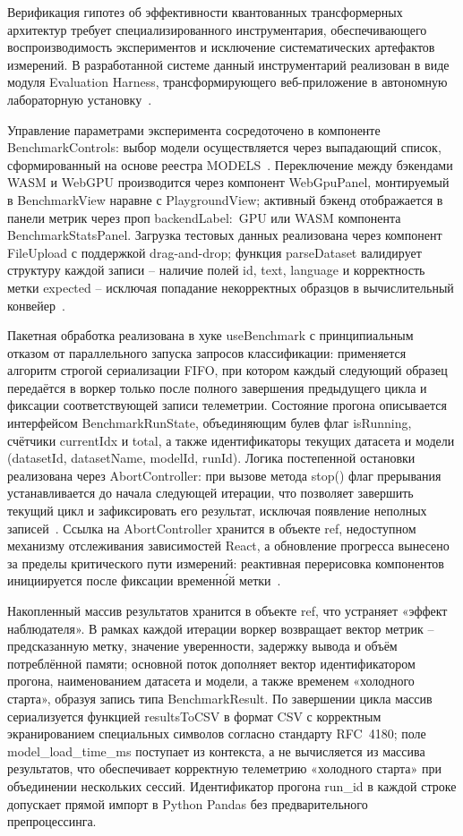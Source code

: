 Верификация гипотез об эффективности квантованных трансформерных архитектур требует специализированного инструментария, обеспечивающего воспроизводимость экспериментов и исключение систематических артефактов измерений. В разработанной системе данный инструментарий реализован в виде модуля Evaluation Harness, трансформирующего веб-приложение в автономную лабораторную установку~\cite{wang2024anatomizing, husom2025sustainable}.

Управление параметрами эксперимента сосредоточено в компоненте BenchmarkControls: выбор модели осуществляется через выпадающий список, сформированный на основе реестра MODELS~\cite{xu2024ondevice}. Переключение между бэкендами WASM и WebGPU производится через компонент WebGpuPanel, монтируемый в BenchmarkView наравне с PlaygroundView; активный бэкенд отображается в панели метрик через проп backendLabel:~GPU или WASM компонента BenchmarkStatsPanel. Загрузка тестовых данных реализована через компонент FileUpload с поддержкой drag-and-drop; функция parseDataset валидирует структуру каждой записи – наличие полей id, text, language и корректность метки expected – исключая попадание некорректных образцов в вычислительный конвейер~\cite{wang2024anatomizing}.

Пакетная обработка реализована в хуке useBenchmark с принципиальным отказом от параллельного запуска запросов классификации: применяется алгоритм строгой сериализации FIFO, при котором каждый следующий образец передаётся в воркер только после полного завершения предыдущего цикла и фиксации соответствующей записи телеметрии. Состояние прогона описывается интерфейсом BenchmarkRunState, объединяющим булев флаг isRunning, счётчики currentIdx и total, а также идентификаторы текущих датасета и модели (datasetId, datasetName, modelId, runId). Логика постепенной остановки реализована через AbortController: при вызове метода stop() флаг прерывания устанавливается до начала следующей итерации, что позволяет завершить текущий цикл и зафиксировать его результат, исключая появление неполных записей~\cite{jia2024empowering}. Ссылка на AbortController хранится в объекте ref, недоступном механизму отслеживания зависимостей React, а обновление прогресса вынесено за пределы критического пути измерений: реактивная перерисовка компонентов инициируется после фиксации временно́й метки~\cite{wang2024anatomizing}.

Накопленный массив результатов хранится в объекте ref, что устраняет «эффект наблюдателя». В рамках каждой итерации воркер возвращает вектор метрик – предсказанную метку, значение уверенности, задержку вывода и объём потреблённой памяти; основной поток дополняет вектор идентификатором прогона, наименованием датасета и модели, а также временем «холодного старта», образуя запись типа BenchmarkResult. По завершении цикла массив сериализуется функцией resultsToCSV в формат CSV с корректным экранированием специальных символов согласно стандарту RFC~4180; поле model\_load\_time\_ms поступает из контекста, а не вычисляется из массива результатов, что обеспечивает корректную телеметрию «холодного старта» при объединении нескольких сессий. Идентификатор прогона run\_id в каждой строке допускает прямой импорт в Python Pandas без предварительного препроцессинга.

